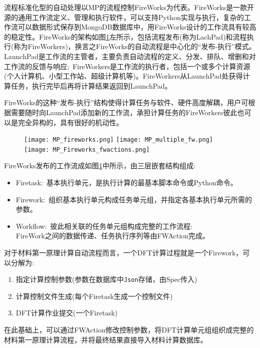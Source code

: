 {流程标准化型的自动处理以\textrm{MP}的流程控制\textrm{FireWorks}为代表。\textrm{FireWorks}是一款开源的通用工作流定义、管理和执行软件，可以支持\textrm{Python}实现与执行，复杂的工作流可以数据形式保存到\textrm{MongoDB}数据库中，用\textrm{FireWorks}设计的工作流具有较高的稳定性。\textrm{FireWorks}的架构如图\ref{FireWorks_FW}左所示，包括流程发布(称为\textrm{LachPad})和流程执行(称为\textrm{FireWorkers})，换言之\textrm{FireWorks}的自动流程是中心化的“发布-执行”模式。\textrm{LaunchPad}是工作流的主管者，主要负责自动流程的定义、分发、排队、增删和对工作流的反馈与响应;~\textrm{FireWorkers}是工作流的执行者，包括一个或多个计算资源(个人计算机、小型工作站、超级计算机等)。\textrm{FireWorkers}从\textrm{LaunchPad}处获得计算任务，执行完毕后再将计算结果返回到\textrm{LaunchPad}。

\textrm{FireWorks}的这种“发布-执行”结构使得计算任务与软件、硬件高度解耦，用户可根据需要随时向\textrm{LaunchPad}添加新的工作流，承担计算任务的\textrm{FireWorkers}彼此也可以是完全异构的，具有很好的机动性。
\begin{figure}[h!]
\centering
\vspace*{-0.1in}
\texttt{[image: MP\_fireworks.png]}
\hskip 5pt
\texttt{[image: MP\_multiple\_fw.png]}
\hskip 5pt
\texttt{[image: MP\_Fireworks\_fwactions.png]}
\caption{\fontsize{7.2pt}{4.2pt}}%
\label{FireWorks_FW}
\end{figure} 
\textrm{FireWorks}发布的工作流成如图\ref{FireWorks_FW}中所示，由三层嵌套结构组成:
\begin{itemize}
	\item \textrm{Firetask}:~基本执行单元，是执行计算的最基本脚本命令或\textrm{Python}命令。
	\item \textrm{Firework}:~组织基本执行单元构成任务单元组，并指定各基本执行单元所需的参数。
	\item \textrm{Workflow}:~彼此相关联的任务单元组构成完整的工作流程:\\
		\textrm{FireWork}之间的数据传递、任务执行序列等由\textrm{FWAction}完成。
\end{itemize}
对于材料第一原理计算自动流程而言，一个\textrm{DFT}计算过程就是一个\textrm{Firework}，可以分解为:
\begin{enumerate}
	\item 指定计算控制参数(参数在数据库中\texttt{Json}存储，由\textrm{Spec}传入)
	\item 计算控制文件生成(每个\textrm{Firetask}生成一个控制文件)
	\item \textrm{DFT}计算作业提交(一个\textrm{Firetask})
\end{enumerate}
在此基础上，可以通过\textrm{FWAction}修改控制参数，将\textrm{DFT}计算单元组组织成完整的材料第一原理计算流程，并将最终结果直接导入材料计算数据库。

}
